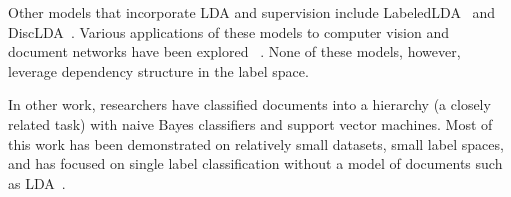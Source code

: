 Other models that incorporate LDA and supervision include
LabeledLDA~\citep{Ramage2009} and DiscLDA~\citep{DiscLDA}.  Various applications of these models to 
computer vision and document networks have been explored~\citep{wangbleifeifei08,RelationalLDA} .
None of these models, however, leverage dependency structure in the label space.

In other work, researchers have classified documents into a hierarchy (a closely related task) with naive Bayes classifiers
and support vector machines. Most of this work has been demonstrated on relatively
small datasets, small label spaces, and has focused on single label classification without
a model of documents such as LDA~\citep{mccallum99building,Dumais2000HCW,Kollerilprints291,Chakrabarti1998SFS}.


